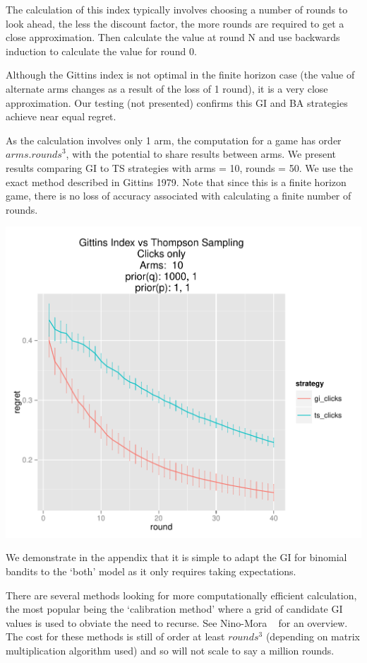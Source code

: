 \documentclass[12pt]{article}
\begin{document}
The calculation of this index typically involves choosing a number of rounds to look ahead, the less the discount factor, the more rounds are required to get a close approximation. Then calculate the value at round N and use backwards induction to calculate the value for round 0.

Although the Gittins index is not optimal in the finite horizon case (the value of alternate arms changes as a result of the loss of 1 round), it is a very close approximation. Our testing (not presented) confirms this GI and BA strategies achieve near equal regret.

As the calculation involves only 1 arm, the computation for a game has order ${arms} .{rounds}^3$, with the potential to share results between arms. We present results comparing GI to TS strategies with arms = 10, rounds = 50. We use the exact method described in Gittins 1979. Note that since this is a finite horizon game, there is no loss of accuracy associated with calculating a finite number of rounds.

\includegraphics[scale=0.7]{GIvsTS.pdf}

We demonstrate in the appendix that it is simple to adapt the GI for binomial bandits to the ‘both’ model as it only requires taking expectations.

There are several methods looking for more computationally efficient calculation, the most popular being the ‘calibration method’ where a grid of candidate GI values is used to obviate the need to recurse. See Nino-Mora ~\cite{nino2011computing} for an overview. The cost for these methods is still of order at least $rounds^3$ (depending on matrix multiplication algorithm used) and so will not scale to say a million rounds.
\end{document}

